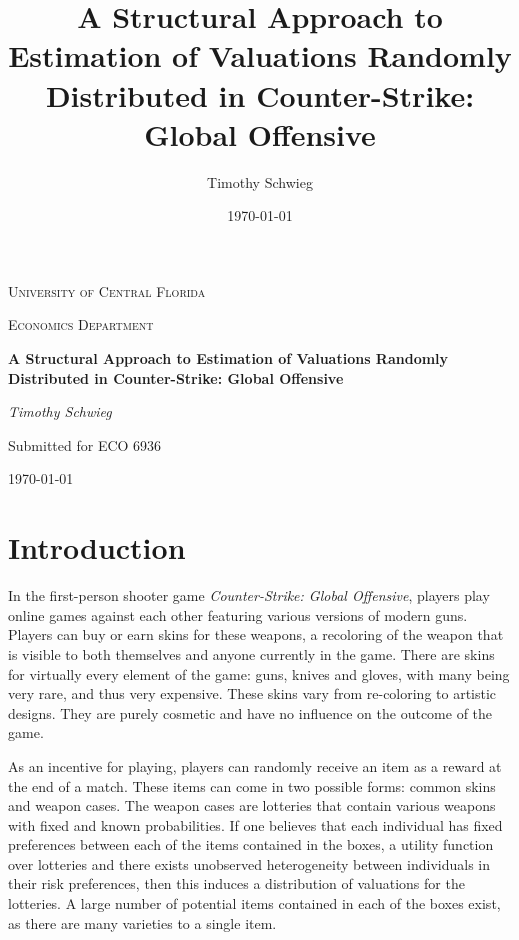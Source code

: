 \documentclass[12pt, letterpaper]{paper}
\author{Timothy Schwieg}
\date{\today}
\title{A Structural Approach to Estimation of Valuations Randomly Distributed in Counter-Strike: Global Offensive}
\renewcommand\maketitle{}
\begin{document}
\maketitle


\begin{titlepage}
\vspace{2.5cm}
\centering
{\scshape\LARGE University of Central Florida\par}
\vspace{1cm}
{\scshape Economics Department\par}
\vspace{2.5cm}
{\huge\bfseries A Structural Approach to Estimation of Valuations Randomly Distributed in Counter-Strike: Global Offensive \par}
\vspace{3cm}
{\Large\itshape Timothy Schwieg\par}
\vfill
Submitted for ECO 6936
\vfill

{\large \today\par}
\end{titlepage}


\section{Introduction}
\label{sec-1}
In the first-person shooter game \emph{Counter-Strike: Global Offensive},
players play online games against each other featuring various
versions of modern guns. Players can buy or earn skins for these
weapons, a recoloring of the weapon that is visible to both themselves
and anyone currently in the game. There are skins for virtually
every element of the game: guns, knives and gloves, with many being
very rare, and thus very expensive. These skins vary from re-coloring
to artistic designs. They are purely cosmetic and have no influence on
the outcome of the game.

As an incentive for playing, players can randomly receive an item as a
reward at the end of a match. These items can come in two possible
forms: common skins and weapon cases. The weapon cases are lotteries
that contain various weapons with fixed and known probabilities. If one
believes that each individual has fixed preferences between each of the
items contained in the boxes, a utility function over lotteries and
there exists unobserved heterogeneity between individuals in their
risk preferences, then this induces a distribution of valuations for the
lotteries. A large number of potential items contained in
each of the boxes exist, as there are many varieties to a single item.
\end{document}
